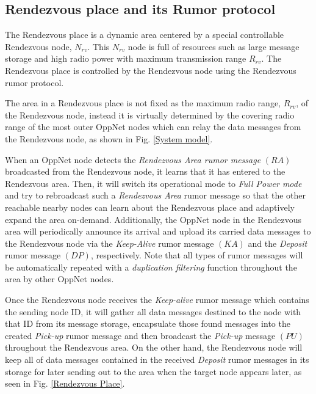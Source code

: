 \subsection{Rendezvous place and its Rumor protocol}

The Rendezvous place is a dynamic area centered by a special controllable Rendezvous node, $N_{rv}$.
%
This $N_{rv}$ node is full of resources such as large message storage and high radio power with maximum transmission range $R_{rv}$.
%
The Rendezvous place is controlled by the Rendezvous node using the Rendezvous rumor protocol.

The area in a Rendezvous place is not fixed as the maximum radio range, $R_{rv}$,  of the Rendezvous node, instead it is virtually determined by the covering radio range of the most outer OppNet nodes which can relay the data messages from the Rendezvous node, as shown in Fig. \ref{System model}.

When an OppNet node detects the \emph{Rendezvous Area rumor message} $(RA)$ broadcasted from the Rendezvous node, it learns that it has entered to the Rendezvous area.
%
Then, it will switch its operational mode to \emph{Full Power mode} and try to rebroadcast such a \emph{Rendezvous Area }rumor message so that the other reachable nearby nodes can learn about the Rendezvous place and adaptively expand the area on-demand.
%
Additionally, the OppNet node in the Rendezvous area will periodically announce its arrival and upload its carried data messages to the Rendezvous node via the \emph{Keep-Alive} rumor message $(KA)$ and the \emph{Deposit} rumor message $(DP)$, respectively.
%
Note that all types of rumor messages will be automatically repeated with a \emph{duplication filtering} function throughout the area by other OppNet nodes.

Once the Rendezvous node receives the \emph{Keep-alive} rumor message which contains the sending node ID, it will gather all data messages destined to the node with that ID from its message storage, encapsulate those found messages into the created \emph{Pick-up} rumor message and then broadcast the \emph{Pick-up} message $(PU)$ throughout the Rendezvous area.
%
On the other hand, the Rendezvous node will keep all of data messages contained in the received \emph{Deposit} rumor messages in its storage for later sending out to the area when the target node appears later, as seen in Fig. \ref{Rendezvous Place}. 

